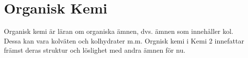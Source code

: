 \documentclass[12pt]{article}
\theoremstyle{definition}
\begin{document}




    \part{Organisk Kemi}
    Organisk kemi är läran om organiska ämnen, dvs. ämnen som innehåller kol. Dessa kan vara kolväten och kolhydrater m.m. Orgnisk kemi i Kemi 2 innefattar främst deras struktur och löslighet med andra ämnen för nu.

    
\end{document}

